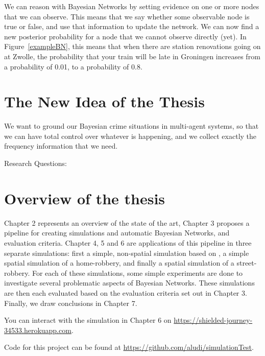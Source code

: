 We can reason with Bayesian Networks by setting evidence on one or more nodes that we can observe. This means that we say whether some observable node is true or false, and use that information to update the network. We can now find a new posterior probability for a node that we cannot observe directly (yet). In Figure~\ref{exampleBN}, this means that when there are station renovations going on at Zwolle, the probability that your train will be late in Groningen increases from a probability of 0.01, to a probability of 0.8.

\section{The New Idea of the Thesis}
We want to ground our Bayesian crime situations in multi-agent systems, so that we can have total control over whatever is happening, and we collect exactly the frequency information that we need.

Research Questions:


\section{Overview of the thesis}
Chapter 2 represents an overview of the state of the art, Chapter 3 proposes a pipeline for creating simulations and automatic Bayesian Networks, and evaluation criteria. Chapter 4, 5 and 6 are applications of this pipeline in three separate simulations: first a simple, non-spatial simulation based on \citep{Vlek2015}, a simple spatial simulation of a home-robbery, and finally a spatial simulation of a street-robbery. For each of these simulations, some simple experiments are done to investigate several problematic aspects of Bayesian Networks. These simulations are then each evaluated based on the evaluation criteria set out in Chapter 3. Finally, we draw conclusions in Chapter 7. 

You can interact with the simulation in Chapter 6 on \url{https://shielded-journey-34533.herokuapp.com}.

Code for this project can be found at \url{https://github.com/aludi/simulationTest}.
